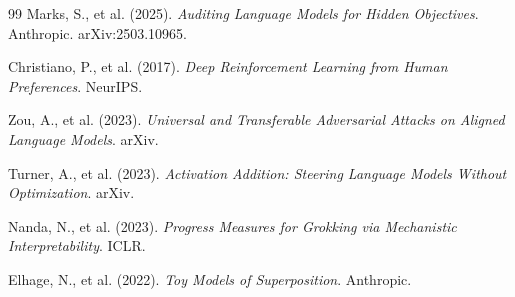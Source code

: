 \documentclass[11pt,letterpaper]{article}
\begin{document}
\begin{thebibliography}{99}
 Marks, S., et al. (2025). \textit{Auditing Language Models for Hidden Objectives}. Anthropic. arXiv:2503.10965.

 Christiano, P., et al. (2017). \textit{Deep Reinforcement Learning from Human Preferences}. NeurIPS.

 Zou, A., et al. (2023). \textit{Universal and Transferable Adversarial Attacks on Aligned Language Models}. arXiv.

 Turner, A., et al. (2023). \textit{Activation Addition: Steering Language Models Without Optimization}. arXiv.

 Nanda, N., et al. (2023). \textit{Progress Measures for Grokking via Mechanistic Interpretability}. ICLR.

 Elhage, N., et al. (2022). \textit{Toy Models of Superposition}. Anthropic.
\end{thebibliography}
\endgroup

\newpage
\thispagestyle{empty}
\end{document}
